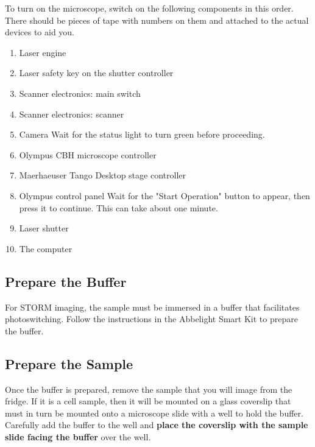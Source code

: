 \documentclass[10pt,a4paper,oneside]{book}
\begin{document}
To turn on the microscope, switch on the following components in this order. There should be pieces of tape with numbers on them and attached to the actual devices to aid you.

\begin{enumerate}
    \item Laser engine
    \item Laser safety key on the shutter controller
    \item Scanner electronics: main switch
    \item Scanner electronics: scanner
    \item Camera \newline Wait for the status light to turn green before proceeding.
    \item Olympus CBH microscope controller
    \item Maerhaeuser Tango Desktop stage controller
    \item Olympus control panel \newline Wait for the "Start Operation" button to appear, then press it to continue. This can take about one minute.
    \item Laser shutter
    \item The computer
\end{enumerate}

\subsection{Prepare the Buffer}

\newline

For STORM imaging, the sample must be immersed in a buffer that facilitates photoswitching. Follow the instructions in the Abbelight Smart Kit to prepare the buffer.

\subsection{Prepare the Sample}

Once the buffer is prepared, remove the sample that you will image from the fridge. If it is a cell sample, then it will be mounted on a glass coverslip that must in turn be mounted onto a microscope slide with a well to hold the buffer. Carefully add the buffer to the well and \textbf{place the coverslip with the sample slide facing the buffer} over the well.
\end{document}
